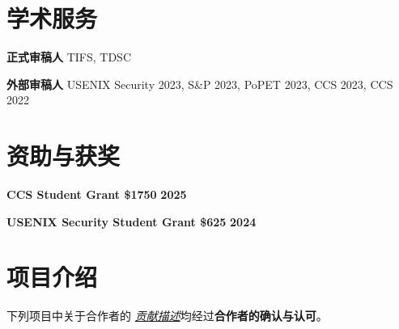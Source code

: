 \documentclass{resume}
\begin{document}
\section{\textbf{学术服务}}
\begin{content}
	\textbf{正式审稿人} \enspace TIFS, TDSC

	\textbf{外部审稿人} \enspace USENIX Security 2023, S\&P 2023, PoPET 2023, CCS 2023, CCS 2022
\end{content}

\section{\textbf{资助与获奖}}
\begin{content}
  \textbf{CCS Student Grant \$1750} \hfill {\bf 2025}

  \textbf{USENIX Security Student Grant \$625} \hfill {\bf 2024}
\end{content}

\section{\textbf{项目介绍}}

下列项目中关于合作者的 \underline{\textit{贡献描述}}均经过\textbf{合作者的确认与认可}。
\end{document}
